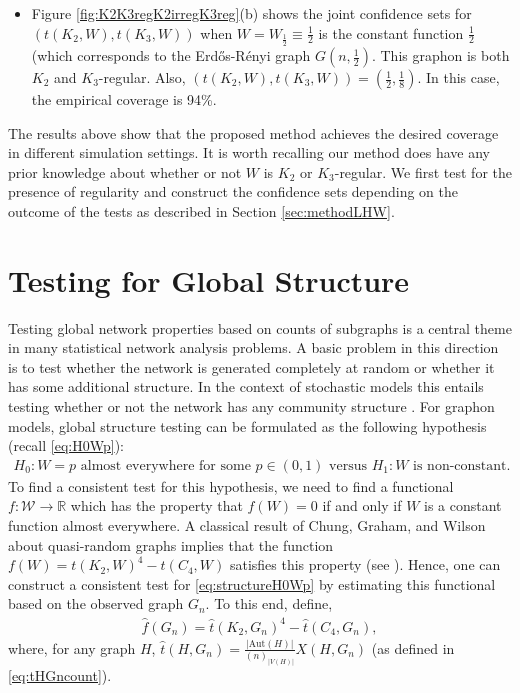 \documentclass[11pt,reqno]{amsart}
\numberwithin{equation}{section}
\theoremstyle{definition}
\begin{document}
\begin{itemize}
\item Figure \ref{fig:K2K3regK2irregK3reg}(b) shows the joint confidence sets for $(t(K_2, W), t(K_3, W))$ when $W= W_{\frac{1}{2}} \equiv \frac{1}{2}$ is the constant function $\frac{1}{2}$ (which corresponds to the Erd\H{o}s-R\'enyi graph $G(n, \frac{1}{2})$. This graphon is both $K_2$ and $K_3$-regular. Also, $(t(K_2,W), t(K_3,W) )  = ( \frac{1}{2}, \frac{1}{8} )$. In this case, the empirical coverage is 94\%. 

\end{itemize}

The results above show that the proposed method achieves the desired coverage in different simulation settings. It is worth recalling our method does have any prior knowledge about whether or not $W$ is $K_2$ or $K_3$-regular. We first test for the presence of regularity and construct the confidence sets depending on the outcome of the tests as described in Section \ref{sec:methodLHW}. 

\section{Testing for Global Structure} 
\label{sec:structure} 


Testing global network properties based on counts of subgraphs is a central theme in many statistical network analysis problems.  
A basic problem in this direction is to test whether the network is generated completely at random or whether it has some additional structure. In the context of stochastic models this entails testing whether or not the network has any community structure \cite{gao2017subgraph,gao2017testing}. For graphon models, global structure testing can be formulated as the following hypothesis (recall \eqref{eq:H0Wp}): 
\begin{align}\label{eq:structureH0Wp}
    H_0: W = p \text{ almost everywhere for some } p \in (0, 1) \text{ versus } H_1: W \text{ is non-constant} . 
\end{align}
To find a consistent test for this hypothesis, we need to find a functional $f: \mathcal W \rightarrow \mathbb{R}$ which has the property that $f(W) = 0$ if and only if $W$ is a constant function almost everywhere. A classical result of Chung, Graham, and Wilson about quasi-random graphs \cite{chung1989cycle} implies that the function $f(W) = t(K_{2},W)^{4} - t(C_{4},W)$ satisfies this property (see \cite[Claim 11.53]{lovasz2012large}). Hence, one can construct a consistent test for \eqref{eq:structureH0Wp} by estimating this functional based on the observed graph $G_n$. 
To this end, define,
\begin{align}\label{eq:definitionfGn}
    \hat f(G_n) = \hat t(K_{2}, G_n)^{4} - \hat t(C_{4},G_n),
\end{align}
where, for any graph $H$, $\hat t(H, G_n) = \frac{|\mathrm{Aut}(H)|}{(n)_{|V(H)|}}X(H, G_n)$ (as defined in \eqref{eq:tHGncount}).
\end{document}
